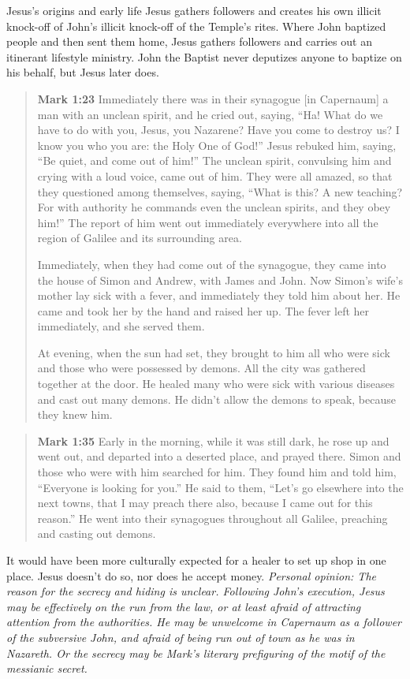 \documentclass[8pt]{article}
\newcommand{\quotesize}{\large{}}
\newenvironment{quotetext}{\begin{quote}\quotesize}{\end{quote}}
\newcommand{\bible}[2]{\begin{quotetext}\textbf{#1} #2\end{quotetext}}
\newcommand{\gospelmark}[2]{\bible{Mark #1}{#2}}
\newcommand{\personal}[1]{\emph{Personal opinion:\/ #1}}
\begin{document}
\begin{section}{Jesus's origins and early life}
Jesus gathers followers and creates his
own illicit knock-off of John's illicit knock-off of the Temple's rites.
Where John baptized people and then sent them home, Jesus gathers followers and 
carries out an itinerant lifestyle ministry. John the Baptist never deputizes anyone to baptize on his behalf,
but Jesus later does.

\gospelmark{1:23}{Immediately there was in their synagogue [in Capernaum] a man with an unclean spirit, and he cried out,   saying, ``Ha! What do we have to do with you, Jesus, you Nazarene? Have you come to destroy us? I know you who you are: the Holy One of God!''
  Jesus rebuked him, saying, ``Be quiet, and come out of him!''
  The unclean spirit, convulsing him and crying with a loud voice, came out of him.   They were all amazed, so that they questioned among themselves, saying, ``What is this? A new teaching? For with authority he commands even the unclean spirits, and they obey him!''   The report of him went out immediately everywhere into all the region of Galilee and its surrounding area.

  Immediately, when they had come out of the synagogue, they came into the house of Simon and Andrew, with James and John.   Now Simon's wife's mother lay sick with a fever, and immediately they told him about her.   He came and took her by the hand and raised her up. The fever left her immediately, and she served them.

  At evening, when the sun had set, they brought to him all who were sick and those who were possessed by demons.   All the city was gathered together at the door.   He healed many who were sick with various diseases and cast out many demons. He didn't allow the demons to speak, because they knew him.}



\gospelmark{1:35}{Early in the morning, while it was still dark, he rose up and went out, and departed into a deserted place, and prayed there.   Simon and those who were with him searched for him.   They found him and told him, ``Everyone is looking for you.''
  He said to them, ``Let's go elsewhere into the next towns, that I may preach there also, because I came out for this reason.''   He went into their synagogues throughout all Galilee, preaching and casting out demons.}

It would have been more culturally expected for a healer to set up shop in one place. Jesus doesn't do so, nor does
he accept money. \personal{The reason for the secrecy and hiding is unclear. Following John's execution, Jesus may be
effectively on the run from the law, or at least afraid of attracting attention from the authorities. He may be unwelcome
in Capernaum as a follower of the subversive John, and afraid of being run out of town as he was in Nazareth. Or the secrecy
may be Mark's literary prefiguring of the motif of the messianic secret.}


\end{section}
\end{document}
